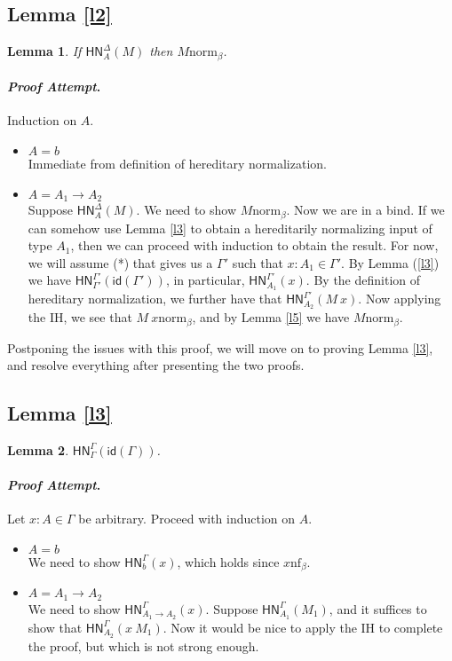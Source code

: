 \documentclass{article}
\newtheorem*{lemm}{Lemma}
\newenvironment{proofattempt}{\paragraph{\emph{Proof Attempt}.}}{\hfill\color{red}{X}\par}
\newcommand{\bnf}[1]{#1 \mathrel{\text{nf}_\beta}}
\newcommand{\bnorm}[1]{#1 \mathrel{\text{norm}_\beta}}
\newcommand{\hnorm}[3]{\ensuremath{\mathsf{HN}^{#1}_{#2}(#3)}}
\newcommand{\id}[1]{\ensuremath{\mathsf{id}(#1)}}
\newcommand{\fn}[2]{\ensuremath{#1 \to #2}}
\newcommand{\ap}[2]{\ensuremath{#1\ #2}}
\begin{document}
\subsection{Lemma \ref{l2}}

\begin{lemm}
If $\hnorm{\Delta}{A}{M}$ then $\bnorm{M}$.
\end{lemm}

\begin{proofattempt}
Induction on $A$.
\begin{itemize}
  \setlength\itemsep{1em}
  \item $A = b$\\
  Immediate from definition of hereditary normalization.
  \item $A = \fn{A_1}{A_2}$\\
  Suppose $\hnorm{\Delta}{A}{M}$. We need to show $\bnorm{M}$. Now we are in a bind. If we can somehow use 
  Lemma \ref{l3} to obtain a hereditarily normalizing input of type $A_1$, then we can proceed with induction 
  to obtain the result. For now, we will assume (*) that gives us a $\Gamma'$ such that $x : A_1 \in \Gamma'$.
  By Lemma (\ref{l3}) we have $\hnorm{\Gamma'}{\Gamma'}{\id{\Gamma'}}$, in particular, $\hnorm{\Gamma'}{A_1}{x}$. By 
  the definition of hereditary normalization, we further have that $\hnorm{\Gamma'}{A_2}{\ap{M}{x}}$. Now applying the 
  IH, we see that $\bnorm{\ap{M}{x}}$, and by Lemma \ref{l5} we have $\bnorm{M}$. 
  \qedhere
\end{itemize}
\end{proofattempt}

Postponing the issues with this proof, we will move on to proving Lemma \ref{l3}, and resolve everything after
presenting the two proofs.

\subsection{Lemma \ref{l3}}

\begin{lemm}
$\hnorm{\Gamma}{\Gamma}{\id{\Gamma}}$.
\end{lemm}

\begin{proofattempt}
Let $x : A \in \Gamma$ be arbitrary. Proceed with induction on $A$.
\begin{itemize}
  \setlength\itemsep{1em}
  \item $A = b$\\
  We need to show $\hnorm{\Gamma}{b}{x}$, which holds since $\bnf{x}$.
  \item $A = \fn{A_1}{A_2}$\\
  We need to show $\hnorm{\Gamma}{\fn{A_1}{A_2}}{x}$. Suppose $\hnorm{\Gamma}{A_1}{M_1}$, and it suffices to show
  that $\hnorm{\Gamma}{A_2}{\ap{x}{M_1}}$. Now it would be nice to apply the IH to complete the proof, but which
  is not strong enough.
\end{itemize}
\end{proofattempt}
\end{document}
